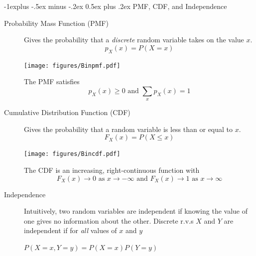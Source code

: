 \documentclass[10pt,landscape]{article}
\makeatletter
\renewcommand{\subsection}{\@startsection{subsection}{2}{0mm}%
                                {-1explus -.5ex minus -.2ex}%
                                {0.5ex plus .2ex}%
                                {\normalfont\normalsize\bfseries}}
\makeatother
\begin{document}
\begin{multicols*}{3}

\subsection{PMF, CDF, and Independence}
\begin{description}

\item[Probability Mass Function (PMF)]
Gives the probability that a \emph{discrete} random variable takes on the value $x$.
\[ p_X(x) = P(X=x) \]
\begin{minipage}{\linewidth}
            \centering
\texttt{[image: figures/Binpmf.pdf]}
\end{minipage}
The PMF satisfies
\[p_X(x) \geq 0 \textrm{ and } \sum_x p_X(x) = 1 \]


\item[Cumulative Distribution Function (CDF)]
Gives the probability that a random variable is less than or equal to $x$.
\[F_X(x) = P(X \leq x)\]
\begin{minipage}{\linewidth}
            \centering
\texttt{[image: figures/Bincdf.pdf]}
        \end{minipage}

The CDF is an increasing, right-continuous function with
\[F_X(x) \to 0 \textrm{ as $x \to -\infty$ and } F_X(x) \to 1 \textrm{ as $x \to \infty$} \]
\item[Independence] Intuitively, two random variables are independent if knowing the value of one gives  no information about the other. Discrete r.v.s $X$ and $Y$ are independent if for \emph{all} values of $x$ and $y$  \begin{center}
$P(X=x, Y=y) = P(X = x)P(Y = y)$
\end{center}


\end{description}
\end{multicols*}
\end{document}
